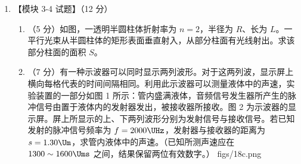 \documentclass[\gkver]{gaokaozhenti}
\begin{document}
\begin{enumerate}
{在停止加热较长一段时间后，氦气的温度逐渐从 $T_{1}=300\UK$ 下降到与外界气体温度相同，即 $T_{2}=225\UK$。这是一等压过程，根据盖—吕萨克定律有 $\frac{V_{2}}{T_{1}}=\frac{V_{3}}{T_{2}}$ ③，式中，$V_{3}$ 是在此等压过程末氦气的体积。由③式得 $V_{3}=5.54\Umc$ ④。
}

\item
【模块 3-4 试题】（12 分）

\begin{enumerate}
	\item
	（5 分）如图，一透明半圆柱体折射率为 $n=2$，半径为 $R$、长为 $L$。一平行光束从半圆柱体的矩形表面垂直射入，从部分柱面有光线射出。求该部分柱面的面积 $S$。
	\item
	（7 分）有一种示波器可以同时显示两列波形。对于这两列波，显示屏上横向每格代表的时间间隔相同。利用此示波器可以测量液体中的声速，实验装置的一部分如图 1 所示：管内盛满液体，音频信号发生器所产生的脉冲信号由置于液体内的发射器发出，被接收器所接收。图 2 为示波器的显示屏。屏上所显示的上、下两列波形分别为发射信号与接收信号。若已知发射的脉冲信号频率为 $f=2000\UHz$，发射器与接收器的距离为 $s=1.30\Um$，求管内液体中的声速。（已知所测声速应在 $1300\sim1600\Ums$ 之间，结果保留两位有效数字。）
	{figs/18c.png}
\end{enumerate}




\end{enumerate}
\end{document}
